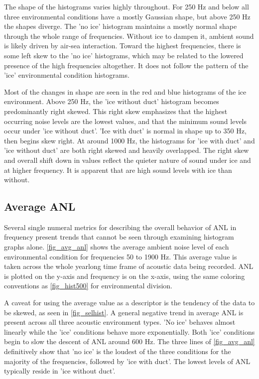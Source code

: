The shape of the histograms varies highly throughout. For 250 Hz and below all three environmental conditions have a mostly Gaussian shape, but above 250 Hz the shapes diverge. The 'no ice' histogram maintains a mostly normal shape through the whole range of frequencies. Without ice to dampen it, ambient sound is likely driven by air-sea interaction. Toward the highest frequencies, there is some left skew to the 'no ice' histograms, which may be related to the lowered presence of the high frequencies altogether. It does not follow the pattern of the 'ice' environmental condition histograms.

Most of the changes in shape are seen in the red and blue histograms of the ice environment. Above 250 Hz, the 'ice without duct' histogram becomes predominantly right skewed. This right skew emphasizes that the highest occurring noise levels are the lowest values, and that the minimum sound levels occur under 'ice without duct'. 'Ice with duct' is normal in shape up to 350 Hz, then begins skew right. At around 1000 Hz, the histograms for 'ice with duct' and 'ice without duct' are both right skewed and heavily overlapped. The right skew and overall shift down in values reflect the quieter nature of sound under ice and at higher frequency. It is apparent that are high sound levels with ice than without.




\subsection{Average ANL} \label{sec_avg_anl}
Several single numeral metrics for describing the overall behavior of ANL in frequency present trends that cannot be seen through examining histogram graphs alone. \autoref{fig_avg_anl} shows the average ambient noise level of each environmental condition for frequencies 50 to 1900 Hz. This average value is taken across the whole yearlong time frame of acoustic data being recorded. ANL is plotted on the y-axis and frequency is on the x-axis, using the same coloring conventions as \autoref{fig_hist500} for environmental division.

A caveat for using the average value as a descriptor is the tendency of the data to be skewed, as seen in \autoref{fig_selhist}. A general negative trend in average ANL is present across all three acoustic environment types. 'No ice' behaves almost linearly while the 'ice' conditions behave more exponentially. Both 'ice' conditions begin to slow the descent of ANL around 600 Hz. The three lines of \autoref{fig_avg_anl} definitively show that 'no ice' is the loudest of the three conditions for the majority of the frequencies, followed by 'ice with duct'. The lowest levels of ANL typically reside in 'ice without duct'.

